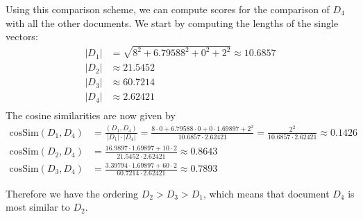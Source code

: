 \documentclass[a4paper]{article}
\newcommand{\cossim}{\text{cosSim}}
\begin{document}
\vspace{5mm}
\noindent Using this comparison scheme, we can compute scores for the comparison of $D_4$ with all the other documents. We start by computing the lengths of the single vectors:
\begin{align*}
 |D_1| &= \sqrt{8^2 + 6.79588^2 + 0^2 + 2^2} \approx 10.6857 \\
 |D_2| &\approx 21.5452 \\
 |D_3| &\approx 60.7214 \\
 |D_4| &\approx 2.62421 \\
\end{align*}
The cosine similarities are now given by
\begin{align*}
 \cossim(D_1,D_4) &= \frac{(D_1,D_4)}{|D_1|\cdot |D_4|} = \frac{8 \cdot 0 + 6.79588 \cdot 0 + 0  \cdot 1.69897 + 2^2}{10.6857 \cdot 2.62421} = \frac{2^2}{10.6857 \cdot 2.62421}  \approx 0.1426 \\
 \cossim(D_2,D_4) &= \frac{16.9897 \cdot 1.69897 + 10 \cdot 2}{21.5452 \cdot 2.62421} \approx 0.8643 \\
 \cossim(D_3,D_4) &= \frac{3.39794 \cdot 1.69897 + 60 \cdot 2}{60.7214 \cdot 2.62421} \approx 0.7893
\end{align*}

\noindent Therefore we have the ordering $D_2 > D_3 > D_1$, which means that document $D_4$ is most similar to $D_2$.
\end{document}
